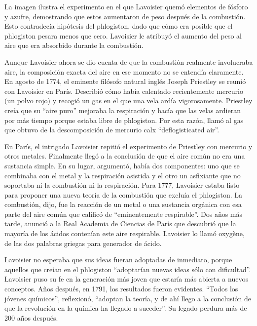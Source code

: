 \documentclass[letterpaper, 10pt, journal]{IEEEtran}
\begin{document}
La imagen ilustra el experimento en el que Lavoisier quemó elementos de fósforo y azufre, demostrando que estos aumentaron de peso después de la combustión. Esto contradecía hipótesis del phlogiston, dado que cómo era posible que el phlogiston pesara menos que cero. Lavoisier le atribuyó el aumento del peso al aire que era absorbido durante la combustión.

Aunque Lavoisier ahora se dio cuenta de que la combustión realmente involucraba aire, la composición exacta del aire en ese momento no se entendía claramente. En agosto de 1774, el eminente filósofo natural inglés Joseph Priestley se reunió con Lavoisier en París. Describió cómo había calentado recientemente mercurio (un polvo rojo) y recogió un gas en el que una vela ardía vigorosamente. Priestley creía que su \textquotedblleft{}aire puro\textquotedblright{} mejoraba la respiración y hacía que las velas ardieran por más tiempo porque estaba libre de phlogiston. Por esta razón, llamó al gas que obtuvo de la descomposición de mercurio calx \textquotedblleft{}deflogisticated air\textquotedblright{}.

En París, el intrigado Lavoisier repitió el experimento de Priestley con mercurio y otros metales. Finalmente llegó a la conclusión de que el aire común no era una sustancia simple. En su lugar, argumentó, había dos componentes: uno que se combinaba con el metal y la respiración asistida y el otro un asfixiante que no soportaba ni la combustión ni la respiración. Para 1777, Lavoisier estaba listo para proponer una nueva teoría de la combustión que excluía el phlogiston. La combustión, dijo, fue la reacción de un metal o una sustancia orgánica con esa parte del aire común que calificó de \textquotedblleft{}eminentemente respirable\textquotedblright{}. Dos años más tarde, anunció a la Real Academia de Ciencias de París que descubrió que la mayoría de los ácidos contenían este aire respirable. Lavoisier lo llamó oxygène, de las dos palabras griegas para generador de ácido.

Lavoisier no esperaba que sus ideas fueran adoptadas de inmediato, porque aquellos que creían en el phlogiston \textquotedblleft{}adoptarían nuevas ideas sólo con dificultad\textquotedblright{}. Lavoisier puso su fe en la generación más joven que estaría más abierta a nuevos conceptos. Años después, en 1791, los resultados fueron evidentes. \textquotedblleft{}Todos los jóvenes químicos\textquotedblright{}, reflexionó, \textquotedblleft{}adoptan la teoría, y de ahí llego a la conclusión de que la revolución en la química ha llegado a suceder\textquotedblright{}. Su legado perdura más de 200 años después.
\end{document}
